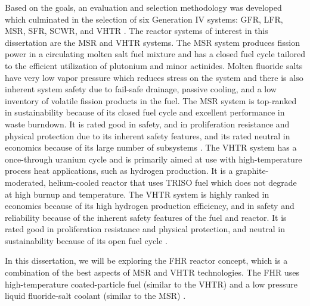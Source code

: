 Based on the goals, an evaluation and selection methodology was developed which 
culminated in the selection of six Generation IV systems: \gls{GFR}, 
\gls{LFR}, \gls{MSR}, \gls{SFR}, \gls{SCWR}, and \gls{VHTR} \cite{gif_technology_2002}. 
The reactor systems of interest in this dissertation are the \gls{MSR} and \gls{VHTR} systems. 
The \gls{MSR} system produces fission power in a circulating molten salt 
fuel mixture and has a closed fuel cycle tailored to the efficient 
utilization of plutonium and minor actinides. 
Molten fluoride salts have very low vapor pressure which reduces stress on the 
system and there is also inherent system safety due to fail-safe drainage, passive 
cooling, and a low inventory of volatile fission products in the fuel.  
The \gls{MSR} system is top-ranked in sustainability because of its closed 
fuel cycle and excellent performance in waste burndown. 
It is rated good in safety, and in proliferation resistance and physical 
protection due to its inherent safety features, and its rated neutral in economics 
because of its large number of subsystems \cite{gif_technology_2002}.  
The \gls{VHTR} system has a once-through uranium cycle and is primarily aimed 
at use with high-temperature process heat applications, such as hydrogen 
production. 
It is a graphite-moderated, helium-cooled reactor that uses \gls{TRISO} fuel 
which does not degrade at high burnup and temperature.  
The \gls{VHTR} system is highly ranked in economics because of its high hydrogen 
production efficiency, and in safety and reliability because of the inherent 
safety features of the fuel and reactor. 
It is rated good in proliferation resistance and physical protection, and 
neutral in sustainability because of its open fuel cycle \cite{gif_technology_2002}. 

In this dissertation, we will be exploring the \gls{FHR} reactor concept, which 
is a combination of the best aspects of \gls{MSR} and \gls{VHTR} technologies. 
The \gls{FHR} uses high-temperature coated-particle fuel (similar to the \gls{VHTR}) 
and a low pressure liquid fluoride-salt coolant (similar to the \gls{MSR})
\cite{forsberg_fluoride-salt-cooled_2012,facilitators_fluoride-salt-cooled_2013}.

